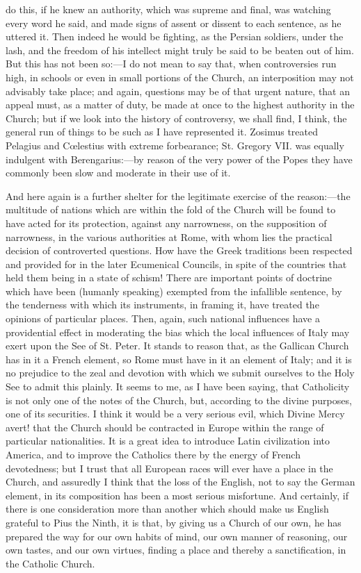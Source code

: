 do this, if he knew an authority, which was supreme and final, was
watching every word he said, and made signs of assent or dissent to each
sentence, as he uttered it. Then indeed he would be fighting, as the
Persian soldiers, under the lash, and the freedom of his intellect might
truly be said to be beaten out of him. But this has not been so:—I do
not mean to say that, when controversies run high, in schools or even in
small portions of the Church, an interposition may not advisably take place; and again, questions may be of that urgent nature, that an
appeal must, as a matter of duty, be made at once to the highest
authority in the Church; but if we look into the history of
controversy, we shall find, I think, the general run of things to be
such as I have represented it. Zosimus treated Pelagius and Cœlestius
with extreme forbearance; St. Gregory VII. was equally indulgent with
Berengarius:—by reason of the very power of the Popes they
have commonly been slow and moderate in their use of it.

And here again is a further shelter for the legitimate exercise
of the reason:—the multitude of nations which are within the fold of the Church will be found to have acted for its
protection, against any narrowness, on the supposition of narrowness, in the various
authorities at Rome, with whom lies the practical decision of
controverted questions. How have the Greek traditions been respected and
provided for in the later Ecumenical Councils, in spite of the countries
that held them being in a state of schism! There are important points of
doctrine which have been (humanly speaking) exempted from the infallible
sentence, by the tenderness with which its instruments, in framing it,
have treated the opinions of particular places. Then, again, such
national influences have a providential effect in moderating the bias
which the local influences of Italy may exert upon the See of St. Peter.
It stands to reason that, as the Gallican Church has in it a French element, so Rome must have
in it an element of Italy;
and it is no prejudice to the zeal and devotion with which we submit
ourselves to the Holy See to admit this plainly. It seems to me, as I
have been saying, that Catholicity is not only one of the notes of the
Church, but, according to the divine purposes, one of its securities. I
think it would be a very serious evil, which Divine Mercy avert! that
the Church should be contracted in Europe within the range of particular
nationalities. It is a great idea to introduce Latin civilization into
America, and to improve the Catholics there by the energy of French
devotedness; but I trust that all European races will ever have a place in the Church, and assuredly I think that the loss of
the English, not to say the German element, in its composition has been
a most serious misfortune. And certainly, if there is one
consideration more than another which should make us English grateful to
Pius the Ninth, it is that, by giving us a Church of our own, he has
prepared the way for our own habits of mind, our own manner of
reasoning, our own tastes, and our own virtues, finding a place and
thereby a sanctification, in the Catholic Church.

